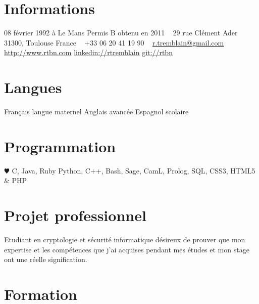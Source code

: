 \documentclass[]{friggeri-cv} %
\begin{document}


\begin{aside} %
\section{Informations}
08 février 1992 à Le Mans
Permis B obtenu en 2011
~
29 rue Clément Ader
31300, Toulouse
France
~
+33 06 20 41 19 90
~
\href{mailto:r.tremblain@gmail.com}{r.tremblain@gmail.com}
\href{http://www.rtbn.com}{http://www.rtbn.com}
\href{fr.linkedin.com/in/rtremblain}{linkedin://rtremblain}
\href{http://github.com/rtbn}{git://rtbn}
\section{Langues}
Français langue maternel
Anglais avancée
Espagnol scolaire
\section{Programmation}
{\color{red} $\varheartsuit$} C, Java, Ruby
Python, C++, Bash, Sage, CamL, Prolog, SQL,
CSS3, HTML5 \& PHP
\end{aside}


\section{Projet professionnel}

Etudiant en cryptologie et sécurité informatique désireux de prouver que mon expertise et les compétences que j'ai acquises pendant mes études et mon stage ont une réelle signification.


\section{Formation}
\end{document}
